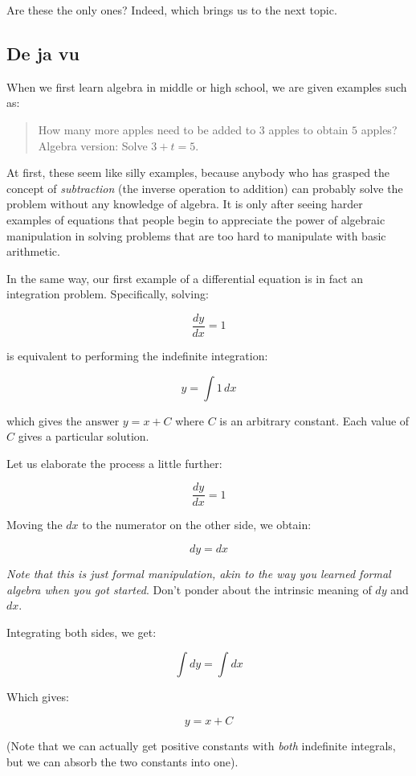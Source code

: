 \documentclass{amsart}
\begin{document}
Are these the only ones? Indeed, which brings us to the next topic.

\subsection{De ja vu}

When we first learn algebra in middle or high school, we are given
examples such as:

\begin{quote}
  How many more apples need to be added to $3$ apples to obtain $5$
  apples? Algebra version: Solve $3 + t = 5$.
\end{quote}

At first, these seem like silly examples, because anybody who has
grasped the concept of {\em subtraction} (the inverse operation to
addition) can probably solve the problem without any knowledge of
algebra. It is only after seeing harder examples of equations that
people begin to appreciate the power of algebraic manipulation in
solving problems that are too hard to manipulate with basic
arithmetic.

In the same way, our first example of a differential equation is in
fact an integration problem. Specifically, solving:

$$\frac{dy}{dx} = 1$$

is equivalent to performing the indefinite integration:

$$y = \int 1 \, dx$$

which gives the answer $y = x + C$ where $C$ is an arbitrary
constant. Each value of $C$ gives a particular solution.

Let us elaborate the process a little further:

$$\frac{dy}{dx} = 1$$

Moving the $dx$ to the numerator on the other side, we obtain:

$$dy = dx$$

{\em Note that this is just formal manipulation, akin to the way you
learned formal algebra when you got started}. Don't ponder about the
intrinsic meaning of $dy$ and $dx$.

Integrating both sides, we get:

$$\int dy = \int dx$$

Which gives:

$$y = x + C$$

(Note that we can actually get positive constants with {\em both}
indefinite integrals, but we can absorb the two constants into one).
\end{document}
